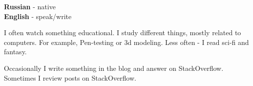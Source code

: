 
\begin{minipage}[t]{0.3\textwidth}
	\vspace{-\baselineskip} %


	\textbf{Russian} - native\\
	\textbf{English} - speak/write\\
\end{minipage}
\hfill
\begin{minipage}[t]{0.3\textwidth}
	\vspace{-\baselineskip} %


  I often watch something educational. I study different things, mostly related to computers. For example, Pen-testing or 3d modeling.
  Less often - I read sci-fi and fantasy.

\end{minipage}
\hfill
\begin{minipage}[t]{0.3\textwidth}
	\vspace{-\baselineskip} %


	Occasionally I write something in the blog and answer on StackOverflow. Sometimes I review posts on StackOverflow.
\end{minipage}




